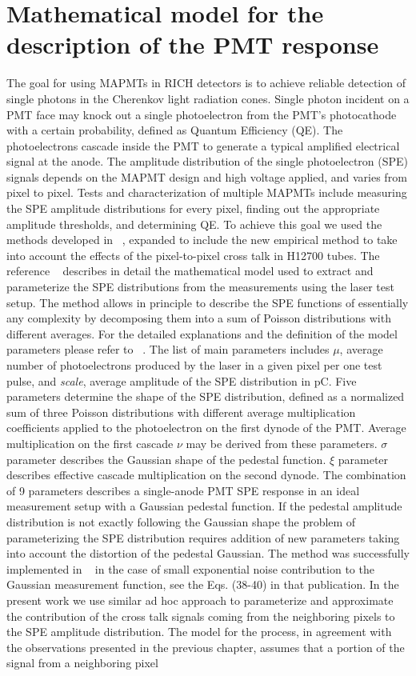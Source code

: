 \section{Mathematical model for the description of the PMT response}

The goal for using MAPMTs in RICH detectors is to achieve reliable detection of single photons in the Cherenkov light radiation cones. Single photon incident on a PMT face may knock out a single photoelectron from the PMT's photocathode with a certain probability, defined as Quantum Efficiency (QE). The photoelectrons cascade inside the PMT to generate a typical amplified electrical signal at the anode. The amplitude distribution of the single photoelectron (SPE) signals depends on the MAPMT design and high voltage applied, and varies from pixel to pixel. Tests and characterization of multiple MAPMTs include measuring the SPE amplitude distributions for every pixel, finding out the appropriate amplitude thresholds, and determining QE. To achieve this goal we used the methods developed in ~\cite{DEGTIARENKO20171}, expanded to include the new empirical method to take into account the effects of the pixel-to-pixel cross talk in H12700 tubes. The reference ~\cite{DEGTIARENKO20171} describes in detail the mathematical model used to extract and parameterize the SPE distributions from the measurements using the laser test setup. The method allows in principle to describe the SPE functions of essentially any complexity by decomposing them into a sum of Poisson distributions with different averages. For the detailed explanations and the definition of the model parameters please refer to ~\cite{DEGTIARENKO20171}. The list of main parameters includes $\mu$, average number of photoelectrons produced by the laser in a given pixel per one test pulse, and {\it{scale}}, average amplitude of the SPE distribution in pC. Five parameters determine the shape of the SPE distribution, defined as a normalized sum of three Poisson distributions with different average multiplication coefficients applied to the photoelectron on the first dynode of the PMT. Average multiplication on the first cascade ${\nu}$ may be derived from these parameters. ${\sigma}$ parameter describes the Gaussian shape of the pedestal function. ${\xi}$ parameter describes effective cascade multiplication on the second dynode. The combination of 9 parameters describes a single-anode PMT SPE response in an ideal measurement setup with a Gaussian pedestal function. If the pedestal amplitude distribution is not exactly following the Gaussian shape the problem of parameterizing the SPE distribution requires addition of new parameters taking into account the distortion of the pedestal Gaussian. The method was successfully implemented in ~\cite{DEGTIARENKO20171} in the case of small exponential noise contribution to the Gaussian measurement function, see the Eqs. (38-40) in that publication. In the present work we use similar ad hoc approach to parameterize and approximate the contribution of the cross talk signals coming from the neighboring pixels to the SPE amplitude distribution. The model for the process, in agreement with the observations presented in the previous chapter, assumes that a portion of the signal from a neighboring pixel 
